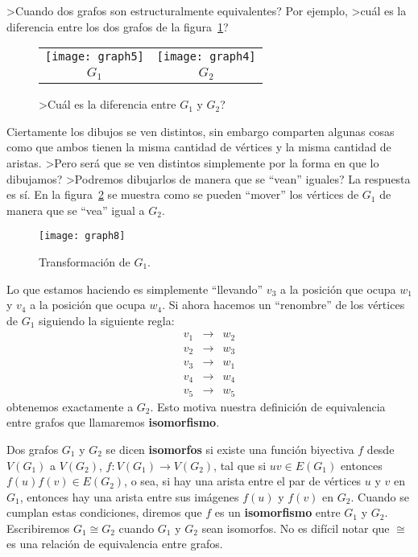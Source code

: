 >Cuando dos grafos son estructuralmente equivalentes?
Por ejemplo, >cuál es la diferencia entre los dos grafos de la figura~\ref{fig:compare-graph}?
\begin{figure}[t!]
\centering
\begin{tabular}{cc}
\texttt{[image: graph5]}\hspace*{3em} & \hspace*{3em}\texttt{[image: graph4]} \\
$G_1$ \hspace*{3em} & \hspace*{3em} $G_2$
\end{tabular}
\caption{>Cuál es la diferencia entre $G_1$ y $G_2$?}
\label{fig:compare-graph}
\end{figure}
Ciertamente los dibujos se ven distintos, sin embargo comparten algunas cosas como que ambos tienen la misma cantidad de vértices y la misma cantidad de aristas.
>Pero será que se ven distintos simplemente por la forma en que lo dibujamos?
>Podremos dibujarlos de manera que se ``vean'' iguales?
La respuesta es sí.
En la figura~\ref{fig:transform} se muestra como se pueden ``mover'' los vértices de $G_1$ de manera que se ``vea'' igual a $G_2$.
\begin{figure}[t!]
\centering
\texttt{[image: graph8]}\\
\caption{Transformación de $G_1$.}
\label{fig:transform}
\end{figure}
Lo que estamos haciendo es simplemente ``llevando'' $v_3$ a la posición que ocupa $w_1$ y $v_4$ a la posición que ocupa $w_4$.
Si ahora hacemos un ``renombre'' de los vértices de $G_1$ siguiendo la siguiente regla:
\[
\begin{array}{ccc}
v_1 & \rightarrow & w_2 \\
v_2 & \rightarrow & w_3 \\
v_3 & \rightarrow & w_1 \\
v_4 & \rightarrow & w_4 \\
v_5 & \rightarrow & w_5
\end{array}
\]
obtenemos exactamente a $G_2$.
Esto motiva nuestra definición de equivalencia entre grafos que llamaremos {\bf isomorfismo}.

\begin{definicion}
Dos grafos $G_1$ y $G_2$ se dicen {\bf isomorfos} si existe una función biyectiva $f$ desde $V(G_1)$ a $V(G_2)$, $f:V(G_1)\rightarrow V(G_2)$, tal que si $uv\in E(G_1)$ entonces $f(u)f(v)\in E(G_2)$, o sea, si hay una arista entre el par de vértices $u$ y $v$ en $G_1$, entonces hay una arista entre sus imágenes $f(u)$ y $f(v)$ en $G_2$.
Cuando se cumplan estas condiciones, diremos que $f$ es un {\bf isomorfismo} entre $G_1$ y $G_2$.
Escribiremos $G_1\cong G_2$ cuando $G_1$ y $G_2$ sean isomorfos.
No es difícil notar que $\cong$ es una relación de equivalencia entre grafos.
\end{definicion}

